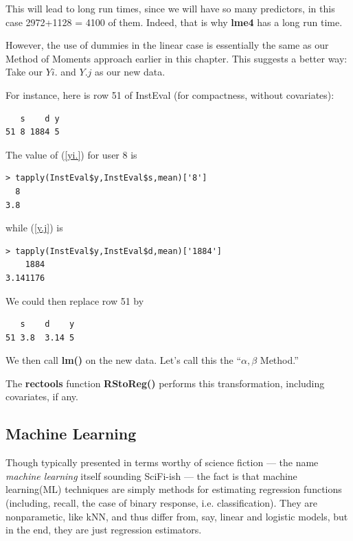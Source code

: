 This will lead to long run times, since we will have so many predictors,
in this case 2972+1128 = 4100 of them.  Indeed, that is why \textbf{lme4}
has a long run time.

However, the use of dummies in the linear case is essentially the same
as our Method of Moments approach earlier in this chapter.  This
suggests a better way:  Take our $Yi.$ and $Y.j$
as our new data.

For instance, here is row 51 of InstEval (for compactness,
without covariates):

\begin{lstlisting}
   s    d y 
51 8 1884 5       
\end{lstlisting}

The value of (\ref{yi.}) for user 8 is

\begin{lstlisting}
> tapply(InstEval$y,InstEval$s,mean)['8']
  8 
3.8 
\end{lstlisting}

while (\ref{y.j}) is

\begin{lstlisting}
> tapply(InstEval$y,InstEval$d,mean)['1884']
    1884 
3.141176 
\end{lstlisting}

We could then replace row 51 by

\begin{lstlisting}
   s    d    y 
51 3.8  3.14 5       
\end{lstlisting}

We then call \textbf{lm()} on the new data.  Let's call this the
``$\alpha,\beta$ Method.''

The \textbf{rectools} function \textbf{RStoReg()} performs this
transformation, including covariates, if any.

\subsection{Machine Learning}

Though typically presented in terms worthy of science fiction --- the
name \textit{machine learning} itself sounding SciFi-ish --- the fact is
that machine learning(ML) techniques are simply methods for estimating
regression functions (including, recall, the case of binary response,
i.e. classification).  They are nonparametic, like kNN, and thus differ
from, say, linear and logistic models, but in the end, they are just
regression estimators.

